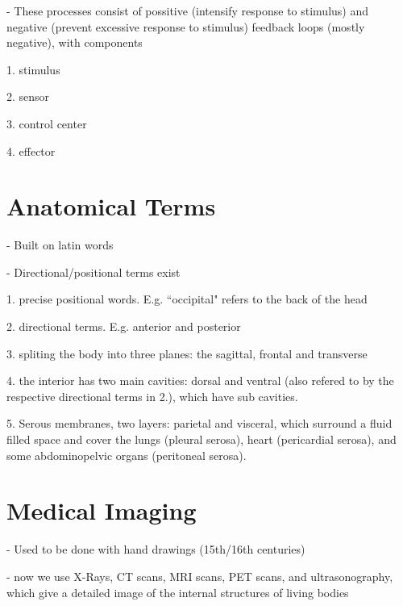 \documentclass{article}
\theoremstyle{definition}
\begin{document}
- These processes consist of possitive (intensify response to stimulus) and negative (prevent excessive response to stimulus) feedback loops (mostly negative), with components

1. stimulus

2. sensor

3. control center

4. effector

\section{Anatomical Terms}

\indent- Built on latin words

- Directional/positional terms exist

1. precise positional words. E.g. ``occipital" refers to the back of the head

2. directional terms. E.g. anterior and posterior

3. spliting the body into three planes: the sagittal, frontal and transverse

4. the interior has two main cavities: dorsal and ventral (also refered to by the respective directional terms in 2.), which have sub cavities.

5. Serous membranes, two layers: parietal and visceral, which surround a fluid filled space and cover the lungs (pleural serosa), heart (pericardial serosa), and some abdominopelvic organs (peritoneal serosa).

\section{Medical Imaging}

\indent- Used to be done with hand drawings (15th/16th centuries)

- now we use X-Rays, CT scans, MRI scans, PET scans, and ultrasonography, which give a detailed image of the internal structures of living bodies
\end{document}
